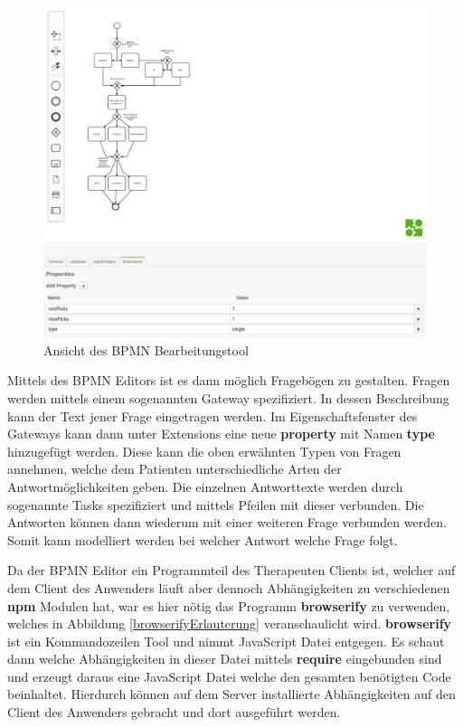 \begin{figure}[H]
	\centering
	\includegraphics[scale=0.37]{images/Screenshots/BPMNModeller}
	\caption[Ansicht des BPMN Bearbeitungstool]{Ansicht des BPMN Bearbeitungstool}
	\label{BPMNModeller}
\end{figure}

Mittels des BPMN Editors ist es dann möglich Fragebögen zu gestalten. Fragen werden mittels einem sogenannten Gateway spezifiziert. In dessen Beschreibung kann der Text jener Frage eingetragen werden. Im Eigenschaftsfenster des Gateways kann dann unter Extensions eine neue \textbf{property} mit Namen \textbf{type} hinzugefügt werden. Diese kann die oben erwähnten Typen von Fragen annehmen, welche dem Patienten unterschiedliche Arten der Antwortmöglichkeiten geben. Die einzelnen Antworttexte werden durch sogenannte Tasks spezifiziert und mittels Pfeilen mit dieser verbunden. Die Antworten können dann wiederum mit einer weiteren Frage verbunden werden. Somit kann modelliert werden bei welcher Antwort welche Frage folgt.

Da der BPMN Editor ein Programmteil des Therapeuten Clients ist, welcher auf dem Client des Anwenders läuft aber dennoch Abhängigkeiten zu verschiedenen \textbf{npm} Modulen hat, war es hier nötig das Programm \textbf{browserify} zu verwenden, welches in Abbildung \ref{browserifyErlauterung} veranschaulicht wird. \textbf{browserify} ist ein Kommandozeilen Tool und nimmt JavaScript Datei entgegen. Es schaut dann welche Abhängigkeiten in dieser Datei mittels \textbf{require} eingebunden sind und erzeugt daraus eine JavaScript Datei welche den gesamten benötigten Code beinhaltet. Hierdurch können auf dem Server installierte Abhängigkeiten auf den Client des Anwenders gebracht und dort ausgeführt werden. 

